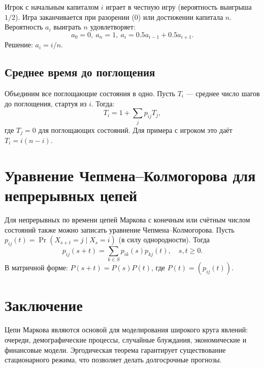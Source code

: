 \documentclass[10pt]{article}
\begin{document}
\begin{example}
Игрок с начальным капиталом $i$ играет в честную игру (вероятность выигрыша $1/2$). Игра заканчивается при разорении (0) или достижении капитала $n$. Вероятность $a_i$ выиграть $n$ удовлетворяет:
\[
a_0 = 0,\ a_n = 1,\ a_i = 0.5 a_{i-1} + 0.5 a_{i+1}.
\]
Решение: $a_i = i/n$.
\end{example}

\subsection{Среднее время до поглощения}
Объединим все поглощающие состояния в одно. Пусть $T_i$ — среднее число шагов до поглощения, стартуя из $i$. Тогда:
\[
T_i = 1 + \sum_{j} p_{ij} T_j,
\]
где $T_j = 0$ для поглощающих состояний. Для примера с игроком это даёт $T_i = i(n-i)$.

\section{Уравнение Чепмена–Колмогорова для непрерывных цепей}
Для непрерывных по времени цепей Маркова с конечным или счётным числом состояний также можно записать уравнение Чепмена–Колмогорова. Пусть $p_{ij}(t) = \Pr(X_{s+t}=j \mid X_s=i)$ (в силу однородности). Тогда
\[
p_{ij}(s+t) = \sum_{k \in S} p_{ik}(s) p_{kj}(t), \quad s,t \ge 0.
\]
В матричной форме: $P(s+t) = P(s) P(t)$, где $P(t) = (p_{ij}(t))$.

\section{Заключение}
Цепи Маркова являются основой для моделирования широкого круга явлений: очереди, демографические процессы, случайные блуждания, экономические и финансовые модели. Эргодическая теорема гарантирует существование стационарного режима, что позволяет делать долгосрочные прогнозы.
\end{document}
